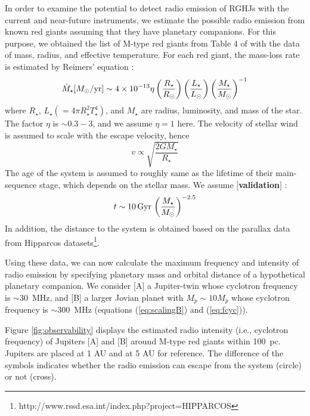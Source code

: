 \documentclass[iop,numberedappendix,apj]{emulateapj}
\def\memoYF#1{\color{red}$[${\bf #1}$]$ \color{black}}
\begin{document}
In order to examine the potential to detect radio emission of RGHJs with the current and near-future instruments, we estimate the possible radio emission from known red giants assuming that they have planetary companions. 
For this purpose, we obtained the list of M-type red giants from Table 4 of \citet{dumm1998} with the data of mass, radius, and effective temperature.
For each red giant, the mass-loss rate is estimated by Reimers' equation \citep{reimers1975}:
\begin{equation}
\dot M_\star [M_\odot{\rm /yr}] \sim 4 \times 10^{-13} \eta \left( \frac{R_{\star }}{R_{\odot }} \right)\left( \frac{L_{\star }}{L_{\odot }} \right) \left( \frac{M_\star}{M_\odot} \right)^{-1}
\end{equation}
where $R_{\star }$, $L_{\star } (=4\pi R_{\star }^2 T_{\star }^4)$, and $M_{\star}$ are radius, luminosity, and mass of the star. 
The factor $\eta $ is $\sim 0.3-3$, and we assume $\eta =1$ here. 
The velocity of stellar wind is assumed to scale with the escape velocity, hence
\begin{equation}
v \propto \sqrt{\frac{2GM_\star}{R_{\star }}}
\end{equation}
The age of the system is assumed to roughly same as the lifetime of their main-sequence stage, which depends on the stellar mass.
We assume \memoYF{validation}:
\begin{equation}
t \sim 10\,{\rm Gyr}\, \left( \frac{M_{\star}}{M_{\odot }} \right)^{-2.5}
\end{equation}
In addition, the distance to the system is obtained based on the parallax data from Hipparcos datasets\footnote{http://www.rssd.esa.int/index.php?project=HIPPARCOS}. 

Using these data, we can now calculate the maximum frequency and intensity of radio emission by specifying planetary mass and orbital distance of a hypothetical planetary companion. 
We consider [A] a Jupiter-twin whose cyclotron frequency is $\sim 30$~MHz, and [B] a larger Jovian planet with $M_p\sim 10M_p$ whose cyclotron frequency is $\sim 300$~MHz (equations (\ref{eq:scalingB}) and (\ref{eq:fcyc})). 

Figure \ref{fig:observability} displays the estimated radio intensity (i.e., cyclotron frequency) of Jupiters [A] and [B] around M-type red giants within 100~pc. 
Jupiters are placed at 1 AU and at 5 AU for reference. 
The difference of the symbols indicates whether the radio emission can escape from the system (circle) or not (cross). 
\end{document}
